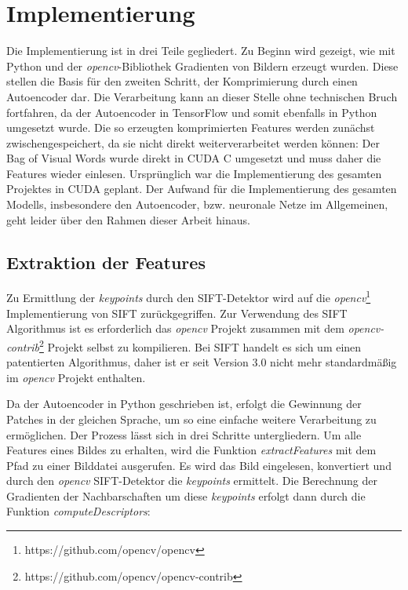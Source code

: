 \chapter{Implementierung}

Die Implementierung ist in drei Teile gegliedert. Zu Beginn wird gezeigt, wie mit Python und der \textit{opencv}-Bibliothek Gradienten von Bildern erzeugt wurden. Diese stellen die Basis für den zweiten Schritt, der Komprimierung durch einen Autoencoder dar. Die Verarbeitung kann an dieser Stelle ohne technischen Bruch fortfahren, da der Autoencoder in TensorFlow und somit ebenfalls in Python umgesetzt wurde. Die so erzeugten komprimierten Features werden zunächst zwischengespeichert, da sie nicht direkt weiterverarbeitet werden können: Der Bag of Visual Words wurde direkt in CUDA C umgesetzt und muss daher die Features wieder einlesen. Ursprünglich war die Implementierung des gesamten Projektes in CUDA geplant. Der Aufwand für die Implementierung des gesamten Modells, insbesondere den Autoencoder, bzw. neuronale Netze im Allgemeinen, geht leider über den Rahmen dieser Arbeit hinaus. 

\section{Extraktion der Features}

Zu Ermittlung der \textit{keypoints} durch den SIFT-Detektor wird auf die \textit{opencv}\footnote{https://github.com/opencv/opencv} Implementierung von SIFT zurückgegriffen. Zur Verwendung des SIFT Algorithmus ist es erforderlich das \textit{opencv} Projekt zusammen mit dem \textit{opencv-contrib}\footnote{https://github.com/opencv/opencv-contrib} Projekt selbst zu kompilieren. Bei SIFT handelt es sich um einen patentierten Algorithmus, daher ist er seit Version 3.0 nicht mehr standardmäßig im \textit{opencv} Projekt enthalten.

Da der Autoencoder in Python geschrieben ist, erfolgt die Gewinnung der Patches in der gleichen Sprache, um so eine einfache weitere Verarbeitung zu ermöglichen. Der Prozess lässt sich in drei Schritte untergliedern. Um alle Features eines Bildes zu erhalten, wird die Funktion \textit{extractFeatures} mit dem Pfad zu einer Bilddatei ausgerufen. Es wird das Bild eingelesen, konvertiert und durch den \textit{opencv} SIFT-Detektor die \textit{keypoints} ermittelt. Die Berechnung der Gradienten der Nachbarschaften um diese \textit{keypoints} erfolgt dann durch die Funktion \textit{computeDescriptors}:

